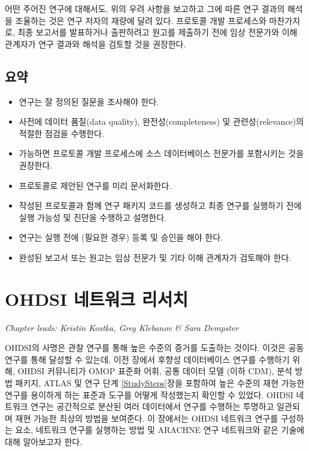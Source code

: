 \documentclass[11pt]{book}
\providecommand{\tightlist}{%
  \setlength{\itemsep}{0pt}\setlength{\parskip}{0pt}}
\theoremstyle{definition}
\theoremstyle{definition}
\theoremstyle{definition}
\theoremstyle{remark}
\let\BeginKnitrBlock\begin \let\EndKnitrBlock\end
\begin{document}
어떤 주어진 연구에 대해서도, 위의 우려 사항을 보고하고 그에 따른 연구
결과의 해석을 조율하는 것은 연구 저자의 재량에 달려 있다. 프로토콜 개발
프로세스와 마찬가지로, 최종 보고서를 발표하거나 출판하려고 원고를
제출하기 전에 임상 전문가와 이해 관계자가 연구 결과와 해석을 검토할 것을
권장한다.

\section{요약}\label{-16}

\BeginKnitrBlock{rmdsummary}
\begin{itemize}
\tightlist
\item
  연구는 잘 정의된 질문을 조사해야 한다.
\item
  사전에 데이터 품질(data quality), 완전성(completeness) 및
  관련성(relevance)의 적절한 점검을 수행한다.
\item
  가능하면 프로토콜 개발 프로세스에 소스 데이터베이스 전문가를
  포함시키는 것을 권장한다.
\item
  프로토콜로 제안된 연구를 미리 문서화한다.
\item
  작성된 프로토콜과 함께 연구 패키지 코드를 생성하고 최종 연구를
  실행하기 전에 실행 가능성 및 진단을 수행하고 설명한다.
\item
  연구는 실행 전에 (필요한 경우) 등록 및 승인을 해야 한다.
\item
  완성된 보고서 또는 원고는 임상 전문가 및 기타 이해 관계자가 검토해야
  한다.
\end{itemize}
\EndKnitrBlock{rmdsummary}

\chapter{OHDSI 네트워크 리서치}\label{NetworkResearch}

\emph{Chapter leads: Kristin Kostka, Greg Klebanov \& Sara Dempster}

OHDSI의 사명은 관찰 연구를 통해 높은 수준의 증거를 도출하는 것이다.
이것은 공동 연구를 통해 달성할 수 있는데, 이전 장에서 후향성
데이터베이스 연구를 수행하기 위해, OHDSI 커뮤니티가 OMOP 표준화 어휘,
공통 데이터 모델 (이하 CDM), 분석 방법 패키지, ATLAS 및 연구 단계
\ref{StudySteps}장을 포함하여 높은 수준의 재현 가능한 연구를 용이하게
하는 표준과 도구를 어떻게 작성했는지 확인할 수 있었다. OHDSI 네트워크
연구는 공간적으로 분산된 여러 데이터에서 연구를 수행하는 투명하고
일관되며 재현 가능한 최상의 방법을 보여준다. 이 장에서는 OHDSI 네트워크
연구를 구성하는 요소, 네트워크 연구를 실행하는 방법 및 ARACHNE 연구
네트워크와 같은 기술에 대해 알아보고자 한다.
\end{document}
